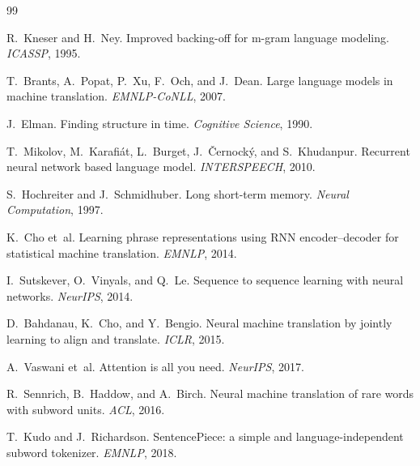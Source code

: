 \begin{thebibliography}{99}

R.~Kneser and H.~Ney.
\newblock Improved backing-off for m-gram language modeling.
\newblock \emph{ICASSP}, 1995.

T.~Brants, A.~Popat, P.~Xu, F.~Och, and J.~Dean.
\newblock Large language models in machine translation.
\newblock \emph{EMNLP-CoNLL}, 2007.

J.~Elman.
\newblock Finding structure in time.
\newblock \emph{Cognitive Science}, 1990.

T.~Mikolov, M.~Karafi\'at, L.~Burget, J.~\v{C}ernock\'y, and S.~Khudanpur.
\newblock Recurrent neural network based language model.
\newblock \emph{INTERSPEECH}, 2010.

S.~Hochreiter and J.~Schmidhuber.
\newblock Long short-term memory.
\newblock \emph{Neural Computation}, 1997.

K.~Cho et~al.
\newblock Learning phrase representations using RNN encoder--decoder for
  statistical machine translation.
\newblock \emph{EMNLP}, 2014.

I.~Sutskever, O.~Vinyals, and Q.~Le.
\newblock Sequence to sequence learning with neural networks.
\newblock \emph{NeurIPS}, 2014.

D.~Bahdanau, K.~Cho, and Y.~Bengio.
\newblock Neural machine translation by jointly learning to align and
  translate.
\newblock \emph{ICLR}, 2015.

A.~Vaswani et~al.
\newblock Attention is all you need.
\newblock \emph{NeurIPS}, 2017.

R.~Sennrich, B.~Haddow, and A.~Birch.
\newblock Neural machine translation of rare words with subword units.
\newblock \emph{ACL}, 2016.

T.~Kudo and J.~Richardson.
\newblock SentencePiece: a simple and language-independent subword tokenizer.
\newblock \emph{EMNLP}, 2018.


\end{thebibliography}
